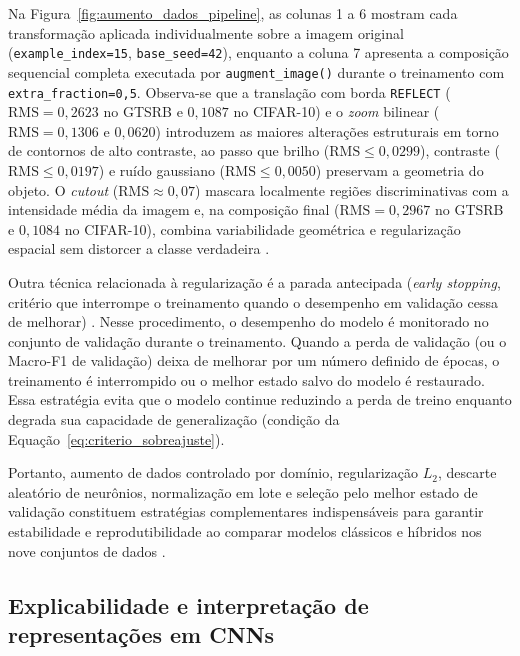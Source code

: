 \documentclass[
    12pt,
    openright,
    oneside,
    a4paper,
    english,
    brazil
]{abntex2}
\begin{document}
Na Figura~\ref{fig:aumento_dados_pipeline}, as colunas 1 a 6 mostram cada transformação aplicada individualmente sobre a imagem original (\texttt{example\_index=15}, \texttt{base\_seed=42}), enquanto a coluna 7 apresenta a composição sequencial completa executada por \texttt{augment\_image()} durante o treinamento com \texttt{extra\_fraction=0,5}. Observa-se que a translação com borda \texttt{REFLECT} (\(\text{RMS} = 0{,}2623\) no GTSRB e \(0{,}1087\) no CIFAR-10) e o \textit{zoom} bilinear (\(\text{RMS} = 0{,}1306\) e \(0{,}0620\)) introduzem as maiores alterações estruturais em torno de contornos de alto contraste, ao passo que brilho (\(\text{RMS} \le 0{,}0299\)), contraste (\(\text{RMS} \le 0{,}0197\)) e ruído gaussiano (\(\text{RMS} \le 0{,}0050\)) preservam a geometria do objeto. O \textit{cutout} (\(\text{RMS} \approx 0{,}07\)) mascara localmente regiões discriminativas com a intensidade média da imagem e, na composição final (\(\text{RMS} = 0{,}2967\) no GTSRB e \(0{,}1084\) no CIFAR-10), combina variabilidade geométrica e regularização espacial sem distorcer a classe verdadeira \cite{gonzalez2008digital,goodfellow2016deep}.

Outra técnica relacionada à regularização é a parada antecipada (\textit{early stopping}, critério que interrompe o treinamento quando o desempenho em validação cessa de melhorar) \cite{goodfellow2016deep,paszke2019pytorch}. Nesse procedimento, o desempenho do modelo é monitorado no conjunto de validação durante o treinamento. Quando a perda de validação (ou o Macro-F1 de validação) deixa de melhorar por um número definido de épocas, o treinamento é interrompido ou o melhor estado salvo do modelo é restaurado. Essa estratégia evita que o modelo continue reduzindo a perda de treino enquanto degrada sua capacidade de generalização (condição da Equação~\eqref{eq:criterio_sobreajuste}).

Portanto, aumento de dados controlado por domínio, regularização \(L_2\), descarte aleatório de neurônios, normalização em lote e seleção pelo melhor estado de validação constituem estratégias complementares indispensáveis para garantir estabilidade e reprodutibilidade ao comparar modelos clássicos e híbridos nos nove conjuntos de dados \cite{goodfellow2016deep,ioffe2015batchnorm,srivastava2014dropout}.

\subsection{Explicabilidade e interpretação de representações em CNNs}
\end{document}
